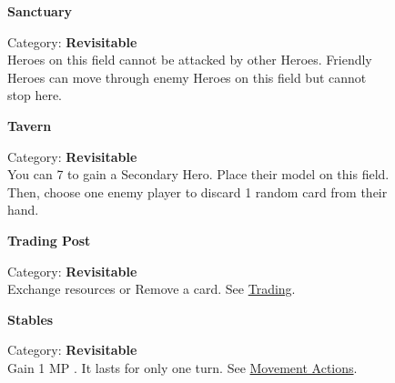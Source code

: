 \begin{figure}[H]
  \begin{minipage}[t]{0.47\textwidth}
    \vspace{0pt}
    \centering
    \textbf{Sanctuary}\par
    \caption{\small Category: \textbf{Revisitable}\\
      Heroes on this field cannot be attacked by other Heroes.
      Friendly Heroes can move through enemy Heroes on this field but cannot stop here.}
  \end{minipage}\hfill
  \begin{minipage}[t]{0.47\textwidth}
    \vspace{0pt}
    \centering
    \phantom{j}\textbf{Tavern}\par
    \caption{\small Category: \textbf{Revisitable}\\
      You can 
      7 
      to gain a Secondary Hero.
      Place their model on this field.
      Then, choose one enemy player to discard 1 random card from their hand.}
  \end{minipage}
\end{figure}

\begin{figure}[H]
  \begin{minipage}[t]{0.47\textwidth}
    \vspace{0pt}
    \centering
    \hypertarget{Trading Post}{\textbf{Trading Post}}\par
    \caption{\small Category: \textbf{Revisitable}\\
      Exchange resources or Remove a card.
      See \protect\hyperlink{Trading}{Trading}.}
  \end{minipage}\hfill
  \begin{minipage}[t]{0.47\textwidth}
    \vspace{0pt}
    \centering
    \phantom{j}\textbf{Stables}\par
    \caption{\small Category: \textbf{Revisitable}\\
      Gain 1 MP .
      It lasts for only one turn.
      See \protect\hyperlink{Movement}{Movement Actions}.
    }
  \end{minipage}
\end{figure}

